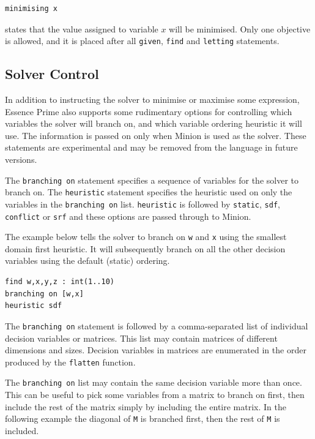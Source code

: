 \documentclass[a4paper]{article}
\newcommand{\eprime}{{\sc Essence Prime}\xspace}
\begin{document}
\begin{verbatim}
minimising x
\end{verbatim}

states that the value assigned to variable $x$ will be minimised.
Only one objective is allowed, and it is placed after all \texttt{given}, 
{\tt find} and {\tt letting} statements.


\subsection{Solver Control}

In addition to instructing the solver to minimise or maximise some expression, 
\eprime also supports some rudimentary options for controlling which variables 
the solver will branch on, and which variable ordering heuristic it will use. 
The information is passed on only when Minion is used as the solver.
These statements are experimental and may be removed from the language in future
versions. 

The \texttt{branching on} statement specifies a sequence of variables for the 
solver to branch on. The \texttt{heuristic} statement specifies the heuristic 
used on only the variables in the \texttt{branching on} list. \texttt{heuristic} 
is followed by \texttt{static}, \texttt{sdf}, \texttt{conflict} or \texttt{srf} and
these options are passed through to Minion. 

The example below tells the solver to branch on \texttt{w} and \texttt{x} using the smallest domain first heuristic.
It will subsequently branch on all the other decision variables using the default 
(static) ordering.

\begin{verbatim}
find w,x,y,z : int(1..10)
branching on [w,x]
heuristic sdf
\end{verbatim}

The \texttt{branching on} statement is followed by a comma-separated list of
individual decision variables or matrices. This list may contain matrices of 
different dimensions and sizes. Decision variables in matrices are enumerated in 
the order produced by the \texttt{flatten} function. 

The \texttt{branching on} list may contain the same decision variable
more than once. This can be useful to pick some variables from a matrix to
branch on first, then include the rest of the matrix simply by including the entire matrix.
In the following example the diagonal of \texttt{M} is branched first, then the rest
of \texttt{M} is included. 
\end{document}
